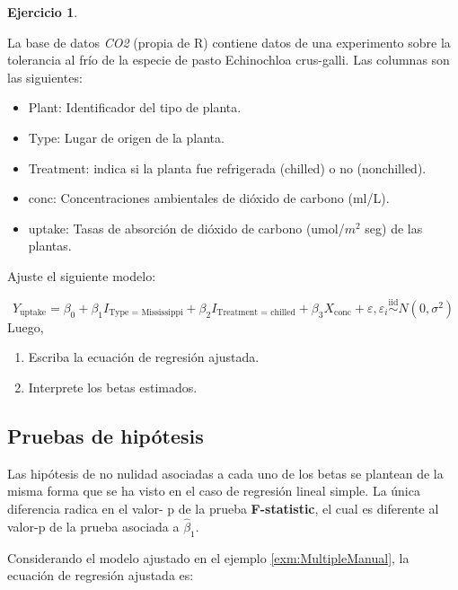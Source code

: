 \documentclass[
  11pt,
]{book}
\providecommand{\tightlist}{%
  \setlength{\itemsep}{0pt}\setlength{\parskip}{0pt}}
\theoremstyle{definition}
\theoremstyle{definition}
\theoremstyle{definition}
\newtheorem{exercise}{Ejercicio}[chapter]
\theoremstyle{definition}
\theoremstyle{remark}
\begin{document}
\begin{exercise}
\protect\hypertarget{exr:co2}{}\label{exr:co2}

La base de datos \emph{CO2} (propia de R) contiene datos de una experimento sobre la tolerancia al frío de la especie de pasto Echinochloa crus-galli. Las columnas son las siguientes:

\begin{itemize}
\tightlist
\item
  Plant: Identificador del tipo de planta.
\item
  Type: Lugar de origen de la planta.
\item
  Treatment: indica si la planta fue refrigerada (chilled) o no (nonchilled).
\item
  conc: Concentraciones ambientales de dióxido de carbono (ml/L).
\item
  uptake: Tasas de absorción de dióxido de carbono (umol/\(m^2\) seg) de las plantas.
\end{itemize}

Ajuste el siguiente modelo:

\[
Y_{\text{uptake}} = \beta_0 + \beta_1I_{\text{Type = Mississippi}} + \beta_2I_{\text{Treatment = chilled}} +  \beta_3X_{\text{conc}} + \varepsilon, \varepsilon_i \overset{\text{iid}}{\sim} N(0,\sigma^2)
\]
Luego,

\begin{enumerate}
\def\labelenumi{\arabic{enumi}.}
\tightlist
\item
  Escriba la ecuación de regresión ajustada.
\item
  Interprete los betas estimados.
\end{enumerate}

\end{exercise}

\subsection{Pruebas de hipótesis}\label{regresion-lineal-multiple-pruebas-hipotesis}

Las hipótesis de no nulidad asociadas a cada uno de los betas se plantean de la misma forma que se ha visto en el caso de regresión lineal simple. La única diferencia radica en el valor- p de la prueba \textbf{F-statistic}, el cual es diferente al valor-p de la prueba asociada a \(\widehat{\beta}_1\).

Considerando el modelo ajustado en el ejemplo \ref{exm:MultipleManual}, la ecuación de regresión ajustada es:
\end{document}
